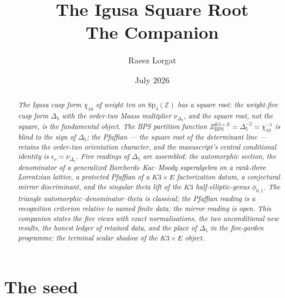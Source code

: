 \documentclass[11pt]{article}
\title{\bfseries The Igusa Square Root\\[0.4em]\Large The Companion}
\author{Raeez Lorgat}
\date{July 2026}
\providecommand{\bZ}{\mathbb{Z}}
\providecommand{\Dfive}{\Delta_5}
\providecommand{\Sp}{\mathrm{Sp}}
\begin{document}
\maketitle

\begin{abstract}
\noindent\itshape
The Igusa cusp form $\chi_{10}$ of weight ten on $\Sp_4(\bZ)$ has a
square root: the weight-five cusp form $\Dfive$ with the order-two
Maass multiplier $\nu_{\Dfive}$, and the square root, not the square,
is the fundamental object. The BPS partition function
$Z^{K3\times E}_{\mathrm{BPS}}=\Dfive^{-2}=\chi_{10}^{-1}$ is blind to
the sign of $\Dfive$; the Pfaffian --- the square root of the
determinant line --- retains the order-two orientation character, and
the manuscript's central conditional identity is
$\epsilon_o=\nu_{\Dfive}$. Five readings of $\Dfive$ are assembled:
the automorphic section, the denominator of a generalized
Borcherds--Kac--Moody superalgebra on a rank-three Lorentzian lattice,
a protected Pfaffian of a $K3\times E$ factorization datum, a
conjectural mirror discriminant, and the singular theta lift of the
$K3$ half-elliptic-genus $\phi_{0,1}$. The triangle
automorphic--denominator--theta is classical; the Pfaffian reading is
a recognition criterion relative to named finite data; the mirror
reading is open. This companion states the five views with exact
normalisations, the two unconditional new results, the honest ledger
of retained data, and the place of $\Dfive$ in the five-garden
programme: the terminal scalar shadow of the $K3\times E$ object.
\end{abstract}

\section{The seed}\label{sec:seed}
\end{document}
